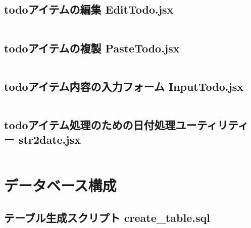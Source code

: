 \documentclass[paper=a4paper, fontsize=10pt, head_space=10mm, foot_space=17mm, gutter=17mm, line_length=185mm, twoside]{jlreq}
\begin{document}
\subsection {todoアイテムの編集 EditTodo.jsx}
\inputminted[linenos, breaklines]{jsx}{src-react/EditTodo.jsx}
\clearpage

\subsection {todoアイテムの複製 PasteTodo.jsx}
\inputminted[linenos, breaklines]{jsx}{src-react/PasteTodo.jsx}
\clearpage

\subsection {todoアイテム内容の入力フォーム InputTodo.jsx}
\inputminted[linenos, breaklines]{jsx}{src-react/InputTodo.jsx}
\clearpage

\subsection {todoアイテム処理のための日付処理ユーティリティー str2date.jsx}
\inputminted[linenos, breaklines]{jsx}{src-react/str2date.jsx}
\clearpage

\section{データベース構成}
\subsection{テーブル生成スクリプト create\_table.sql}
\inputminted[linenos, breaklines]{sql}{mariadb/create_table.sql}
\clearpage
\end{document}
